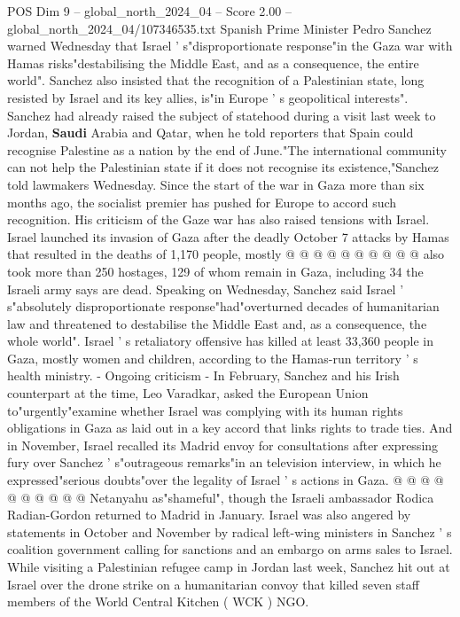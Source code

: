 \begin{textsample}{POS Dim 9 – global\_north\_2024\_04 – Score 2.00 – global\_north\_2024\_04/107346535.txt}  \label{ex:f9_pos_175}
Spanish Prime Minister Pedro Sanchez warned Wednesday that Israel ' s"disproportionate response"in the Gaza war with Hamas risks"destabilising the Middle East, and as a consequence, the entire world".
Sanchez also insisted that the recognition of a Palestinian state, long resisted by Israel and its key allies, is"in Europe ' s geopolitical interests".
Sanchez had already raised the subject of statehood during a visit last week to Jordan, \textbf{Saudi} Arabia and Qatar, when he told reporters that Spain could recognise Palestine as a nation by the end of June."The international community can not help the Palestinian state if it does not recognise its existence,"Sanchez told lawmakers Wednesday.
Since the start of the war in Gaza more than six months ago, the socialist premier has pushed for Europe to accord such recognition.
His criticism of the Gaze war has also raised tensions with Israel.
Israel launched its invasion of Gaza after the deadly October 7 attacks by Hamas that resulted in the deaths of 1,170 people, mostly @ @ @ @ @ @ @ @ @ @ also took more than 250 hostages, 129 of whom remain in Gaza, including 34 the Israeli army says are dead.
Speaking on Wednesday, Sanchez said Israel ' s"absolutely disproportionate response"had"overturned decades of humanitarian law and threatened to destabilise the Middle East and, as a consequence, the whole world".
Israel ' s retaliatory offensive has killed at least 33,360 people in Gaza, mostly women and children, according to the Hamas-run territory ' s health ministry. - Ongoing criticism - In February, Sanchez and his Irish counterpart at the time, Leo Varadkar, asked the European Union to"urgently"examine whether Israel was complying with its human rights obligations in Gaza as laid out in a key accord that links rights to trade ties.
And in November, Israel recalled its Madrid envoy for consultations after expressing fury over Sanchez ' s"outrageous remarks"in an television interview, in which he expressed"serious doubts"over the legality of Israel ' s actions in Gaza. @ @ @ @ @ @ @ @ @ @ Netanyahu as"shameful", though the Israeli ambassador Rodica Radian-Gordon returned to Madrid in January.
Israel was also angered by statements in October and November by radical left-wing ministers in Sanchez ' s coalition government calling for sanctions and an embargo on arms sales to Israel.
While visiting a Palestinian refugee camp in Jordan last week, Sanchez hit out at Israel over the drone strike on a humanitarian convoy that killed seven staff members of the World Central Kitchen ( WCK ) NGO.

\end{textsample}
